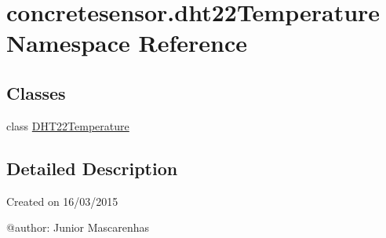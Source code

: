 \hypertarget{namespaceconcretesensor_1_1dht22Temperature}{}\section{concretesensor.\+dht22\+Temperature Namespace Reference}
\label{namespaceconcretesensor_1_1dht22Temperature}
\subsection*{Classes}
\begin{DoxyCompactItemize}
\item 
class \hyperlink{classconcretesensor_1_1dht22Temperature_1_1DHT22Temperature}{D\+H\+T22\+Temperature}
\end{DoxyCompactItemize}


\subsection{Detailed Description}
\begin{DoxyVerb}Created on 16/03/2015

@author: Junior Mascarenhas
\end{DoxyVerb}
 